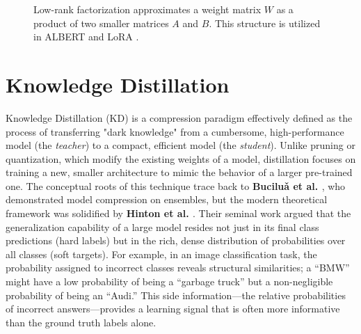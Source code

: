 \begin{figure}[h!]
  \centering
  \caption{Low-rank factorization approximates a weight matrix $W$ as a product of two smaller matrices $A$ and $B$. This structure is utilized in ALBERT \cite{lan2019albert} and LoRA \cite{hu2021lora}.}
  \label{fig:lowrank_concept}
\end{figure}


\section{Knowledge Distillation}

Knowledge Distillation (KD) is a compression paradigm effectively defined as the process of transferring "dark knowledge" from a cumbersome, high-performance model (the \textit{teacher}) to a compact, efficient model (the \textit{student}). Unlike pruning or quantization, which modify the existing weights of a model, distillation focuses on training a new, smaller architecture to mimic the behavior of a larger pre-trained one. The conceptual roots of this technique trace back to \textbf{Buciluǎ et al. \cite{bucilua2006model}}, who demonstrated model compression on ensembles, but the modern theoretical framework was solidified by \textbf{Hinton et al. \cite{hinton2015distilling}}. Their seminal work argued that the generalization capability of a large model resides not just in its final class predictions (hard labels) but in the rich, dense distribution of probabilities over all classes (soft targets). For example, in an image classification task, the probability assigned to incorrect classes reveals structural similarities; a ``BMW'' might have a low probability of being a ``garbage truck'' but a non-negligible probability of being an ``Audi.'' This side information—the relative probabilities of incorrect answers—provides a learning signal that is often more informative than the ground truth labels alone.


